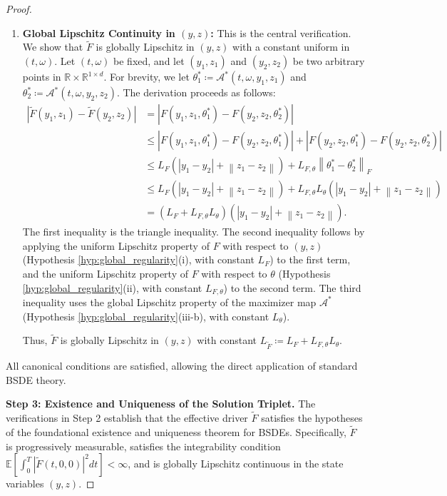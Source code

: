 \documentclass[12pt, letterpaper]{amsart}
\newcommand{\Thetacal}{\mathcal{A}}
\newcommand{\R}{\mathbb{R}}
\newcommand{\norm}[1]{\left\lVert#1\right\rVert}
\newcommand{\abs}[1]{\left\lvert#1\right\rvert}
\theoremstyle{plain}
\theoremstyle{definition}
\theoremstyle{remark}
\numberwithin{equation}{section} %
\begin{document}
\begin{proof}
\begin{enumerate}[label=(\alph*)]
    \item \textbf{Global Lipschitz Continuity in $(y,z)$:} This is the central verification. We show that $\tilde{F}$ is globally Lipschitz in $(y,z)$ with a constant uniform in $(t,\omega)$. Let $(t,\omega)$ be fixed, and let $(y_1,z_1)$ and $(y_2,z_2)$ be two arbitrary points in $\R \times \R^{1\times d}$. For brevity, we let $\theta_1^* \coloneqq \Thetacal^*(t,\omega,y_1,z_1)$ and $\theta_2^* \coloneqq \Thetacal^*(t,\omega,y_2,z_2)$. The derivation proceeds as follows:
    \begin{align*}
        \abs{\tilde{F}(y_1,z_1) - \tilde{F}(y_2,z_2)} &= \abs{F(y_1,z_1,\theta_1^*) - F(y_2,z_2,\theta_2^*)} \\
        &\le \abs{F(y_1,z_1,\theta_1^*) - F(y_2,z_2,\theta_1^*)} + \abs{F(y_2,z_2,\theta_1^*) - F(y_2,z_2,\theta_2^*)} \\
        &\le L_F(\abs{y_1-y_2} + \norm{z_1-z_2}) + L_{F,\theta} \norm{\theta_1^* - \theta_2^*}_F \\
        &\le L_F(\abs{y_1-y_2} + \norm{z_1-z_2}) + L_{F,\theta} L_\theta (\abs{y_1-y_2} + \norm{z_1-z_2}) \\
        &= (L_F + L_{F,\theta}L_\theta) (\abs{y_1 - y_2} + \norm{z_1 - z_2}).
    \end{align*}
    The first inequality is the triangle inequality. The second inequality follows by applying the uniform Lipschitz property of $F$ with respect to $(y,z)$ (Hypothesis \ref{hyp:global_regularity}(i), with constant $L_F$) to the first term, and the uniform Lipschitz property of $F$ with respect to $\theta$ (Hypothesis \ref{hyp:global_regularity}(ii), with constant $L_{F,\theta}$) to the second term. The third inequality uses the global Lipschitz property of the maximizer map $\Thetacal^*$ (Hypothesis \ref{hyp:global_regularity}(iii-b), with constant $L_\theta$).

    Thus, $\tilde{F}$ is globally Lipschitz in $(y,z)$ with constant $L_{\tilde{F}} \coloneqq L_F + L_{F,\theta}L_\theta$.
\end{enumerate}
All canonical conditions are satisfied, allowing the direct application of standard BSDE theory.

\vspace{1ex}
\noindent\textbf{Step 3: Existence and Uniqueness of the Solution Triplet.}
The verifications in Step 2 establish that the effective driver $\tilde{F}$ satisfies the hypotheses of the foundational existence and uniqueness theorem for BSDEs. Specifically, $\tilde{F}$ is progressively measurable, satisfies the integrability condition $\mathbb{E}[\int_0^T |\tilde{F}(t,0,0)|^2 dt] < \infty$, and is globally Lipschitz continuous in the state variables $(y,z)$.


\end{proof}
\end{document}
